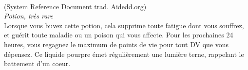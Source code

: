 \\
{\small (System Reference Document trad. Aidedd.org)}\\
{\small \it Potion, très rare}\\
Lorsque vous buvez cette potion, cela supprime toute fatigue dont vous souffrez, et guérit toute maladie ou un poison qui vous affecte. Pour les prochaines 24 heures, vous regagnez le maximum de points de vie pour tout DV que vous dépensez. Ce liquide pourpre émet régulièrement une lumière terne, rappelant le battement d'un coeur. \\

